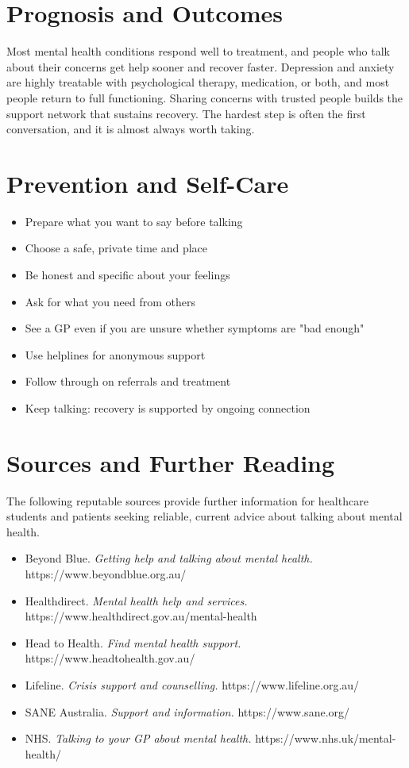 \section*{Prognosis and Outcomes}
Most mental health conditions respond well to treatment, and people who talk about their concerns get help sooner and recover faster. Depression and anxiety are highly treatable with psychological therapy, medication, or both, and most people return to full functioning. Sharing concerns with trusted people builds the support network that sustains recovery. The hardest step is often the first conversation, and it is almost always worth taking.

\section*{Prevention and Self-Care}
\begin{itemize}
    \item Prepare what you want to say before talking
    \item Choose a safe, private time and place
    \item Be honest and specific about your feelings
    \item Ask for what you need from others
    \item See a GP even if you are unsure whether symptoms are "bad enough"
    \item Use helplines for anonymous support
    \item Follow through on referrals and treatment
    \item Keep talking: recovery is supported by ongoing connection
\end{itemize}

\section*{Sources and Further Reading}
The following reputable sources provide further information for healthcare students and patients seeking reliable, current advice about talking about mental health.

\begin{itemize}
    \item Beyond Blue. \textit{Getting help and talking about mental health.} https://www.beyondblue.org.au/
    \item Healthdirect. \textit{Mental health help and services.} https://www.healthdirect.gov.au/mental-health
    \item Head to Health. \textit{Find mental health support.} https://www.headtohealth.gov.au/
    \item Lifeline. \textit{Crisis support and counselling.} https://www.lifeline.org.au/
    \item SANE Australia. \textit{Support and information.} https://www.sane.org/
    \item NHS. \textit{Talking to your GP about mental health.} https://www.nhs.uk/mental-health/
\end{itemize}
